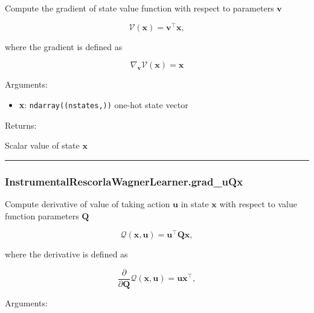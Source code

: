 \begin{Shaded}
\begin{Highlighting}[]
\end{Highlighting}
\end{Shaded}

Compute the gradient of state value function with respect to parameters
\(\mathbf v\)

\[
\mathcal V(\mathbf x) = \mathbf v^\top \mathbf x,
\]

where the gradient is defined as

\[
\nabla_{\mathbf v} \mathcal V(\mathbf x) = \mathbf x
\]

Arguments:

\begin{itemize}
\tightlist
\item
  \textbf{x}: \texttt{ndarray((nstates,))} one-hot state vector
\end{itemize}

Returns:

Scalar value of state \(\mathbf x\)

\begin{center}\rule{0.5\linewidth}{\linethickness}\end{center}

\subsubsection{InstrumentalRescorlaWagnerLearner.grad\_uQx}\label{instrumentalrescorlawagnerlearner.grad_uqx}

\begin{Shaded}
\begin{Highlighting}[]
\end{Highlighting}
\end{Shaded}

Compute derivative of value of taking action \(\mathbf u\) in state
\(\mathbf x\) with respect to value function parameters \(\mathbf Q\)

\[
\mathcal Q(\mathbf x, \mathbf u) = \mathbf u^\top \mathbf Q \mathbf x,
\]

where the derivative is defined as

\[
\frac{\partial}{\partial \mathbf Q} \mathcal Q(\mathbf x, \mathbf u) = \mathbf u \mathbf x^\top,
\]

Arguments:

